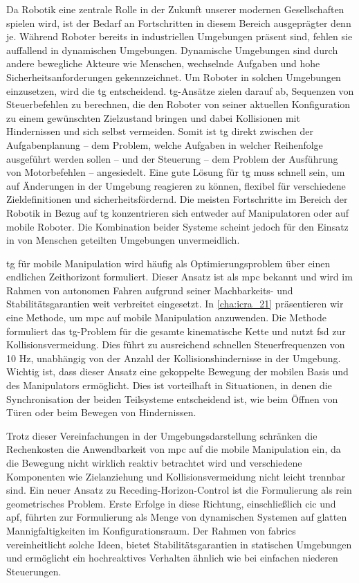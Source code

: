 \acresetall
Da Robotik eine zentrale Rolle in der Zukunft unserer modernen Gesellschaften
spielen wird, ist der Bedarf an Fortschritten in diesem Bereich ausgeprägter
denn je. Während Roboter bereits in industriellen Umgebungen präsent sind,
fehlen sie auffallend in dynamischen Umgebungen. Dynamische Umgebungen sind
durch andere bewegliche Akteure wie Menschen, wechselnde Aufgaben und hohe
Sicherheitsanforderungen gekennzeichnet. Um Roboter in solchen Umgebungen
einzusetzen, wird die \ac{tg} entscheidend. \Ac{tg}-Ansätze zielen darauf ab,
Sequenzen von Steuerbefehlen zu berechnen, die den Roboter von seiner aktuellen
Konfiguration zu einem gewünschten Zielzustand bringen und dabei Kollisionen mit
Hindernissen und sich selbst vermeiden. Somit ist \ac{tg} direkt zwischen der
Aufgabenplanung – dem Problem, welche Aufgaben in welcher Reihenfolge ausgeführt
werden sollen – und der Steuerung – dem Problem der Ausführung von Motorbefehlen
– angesiedelt. Eine gute Lösung für \ac{tg} muss schnell sein, um auf Änderungen
in der Umgebung reagieren zu können, flexibel für verschiedene Zieldefinitionen
und sicherheitsfördernd. Die meisten Fortschritte im Bereich der Robotik in
Bezug auf \ac{tg} konzentrieren sich entweder auf Manipulatoren oder auf mobile
Roboter. Die Kombination beider Systeme scheint jedoch für den Einsatz in von
Menschen geteilten Umgebungen unvermeidlich.

\Ac{tg} für mobile Manipulation wird häufig als Optimierungsproblem über
einen endlichen Zeithorizont formuliert. Dieser Ansatz ist als \ac{mpc} bekannt
und wird im Rahmen von autonomen Fahren aufgrund seiner Machbarkeits- und
Stabilitätsgarantien weit verbreitet eingesetzt. In \cref{cha:icra_21}
präsentieren wir eine Methode, um \ac{mpc} auf mobile Manipulation anzuwenden.
Die Methode formuliert das \ac{tg}-Problem für die gesamte kinematische Kette
und nutzt \ac{fsd} zur Kollisionsvermeidung. Dies führt zu ausreichend schnellen
Steuerfrequenzen von 10 Hz, unabhängig von der Anzahl der Kollisionshindernisse
in der Umgebung. Wichtig ist, dass dieser Ansatz eine gekoppelte Bewegung der
mobilen Basis und des Manipulators ermöglicht. Dies ist vorteilhaft in
Situationen, in denen die Synchronisation der beiden Teilsysteme entscheidend
ist, wie beim Öffnen von Türen oder beim Bewegen von Hindernissen.

Trotz dieser Vereinfachungen in der Umgebungsdarstellung schränken die
Rechenkosten die Anwendbarkeit von \ac{mpc} auf die mobile Manipulation ein, da
die Bewegung nicht wirklich reaktiv betrachtet wird und verschiedene Komponenten
wie Zielanziehung und Kollisionsvermeidung nicht leicht trennbar sind. Ein neuer
Ansatz zu Receding-Horizon-Control ist die Formulierung als rein
geometrisches Problem. Erste Erfolge in diese Richtung, einschließlich \ac{cic}
und \ac{apf}, führten zur Formulierung als Menge von dynamischen Systemen auf
glatten Mannigfaltigkeiten im Konfigurationsraum. Der Rahmen von \ac{fabrics}
vereinheitlicht solche Ideen, bietet Stabilitätsgarantien in statischen
Umgebungen und ermöglicht ein hochreaktives Verhalten ähnlich wie bei einfachen
niederen Steuerungen.

